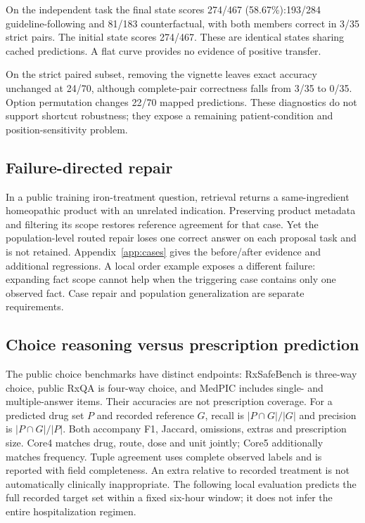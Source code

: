 On the independent task the final state scores 274/467 (58.67\%):193/284 guideline-following and 81/183 counterfactual, with both members correct in 3/35 strict pairs. The initial state scores 274/467. These are identical states sharing cached predictions. A flat curve provides no evidence of positive transfer.

On the strict paired subset, removing the vignette leaves exact accuracy unchanged at 24/70, although complete-pair correctness falls from 3/35 to 0/35. Option permutation changes 22/70 mapped predictions. These diagnostics do not support shortcut robustness; they expose a remaining patient-condition and position-sensitivity problem.

\subsection{Failure-directed repair}
In a public training iron-treatment question, retrieval returns a same-ingredient homeopathic product with an unrelated indication. Preserving product metadata and filtering its scope restores reference agreement for that case. Yet the population-level routed repair loses one correct answer on each proposal task and is not retained. Appendix~\ref{app:cases} gives the before/after evidence and additional regressions. A local order example exposes a different failure: expanding fact scope cannot help when the triggering case contains only one observed fact. Case repair and population generalization are separate requirements.


\subsection{Choice reasoning versus prescription prediction}
The public choice benchmarks have distinct endpoints: RxSafeBench is three-way choice, public RxQA is four-way choice, and MedPIC includes single- and multiple-answer items. Their accuracies are not prescription coverage. For a predicted drug set $P$ and recorded reference $G$, recall is $|P\cap G|/|G|$ and precision is $|P\cap G|/|P|$. Both accompany F1, Jaccard, omissions, extras and prescription size. Core4 matches drug, route, dose and unit jointly; Core5 additionally matches frequency. Tuple agreement uses complete observed labels and is reported with field completeness. An extra relative to recorded treatment is not automatically clinically inappropriate. The following local evaluation predicts the full recorded target set within a fixed six-hour window; it does not infer the entire hospitalization regimen.



